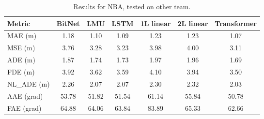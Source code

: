 \begin{table}[H]
\centering
\caption{Results for NBA, tested on other team.}
\label{other_team:NBA}
\begin{tabular}{l||c|c|c|c|c|c}

Metric & BitNet & LMU & LSTM & 1L linear & 2L linear & Transformer \\
\hline\hline
MAE (m) & 1.18 & 1.10 & 1.09 & 1.23 & 1.23 & 1.07 \\
MSE (m) & 3.76 & 3.28 & 3.23 & 3.98 & 4.00 & 3.11 \\
ADE (m) & 1.87 & 1.74 & 1.73 & 1.97 & 1.96 & 1.69 \\
FDE (m) & 3.92 & 3.62 & 3.59 & 4.10 & 3.94 & 3.50 \\
NL\_ADE (m) & 2.26 & 2.07 & 2.07 & 2.30 & 2.32 & 2.03 \\
AAE (grad) & 53.78 & 51.82 & 51.54 & 61.14 & 55.84 & 50.78 \\
FAE (grad) & 64.88 & 64.06 & 63.84 & 83.89 & 65.33 & 62.66 \\
\end{tabular}
\end{table}

